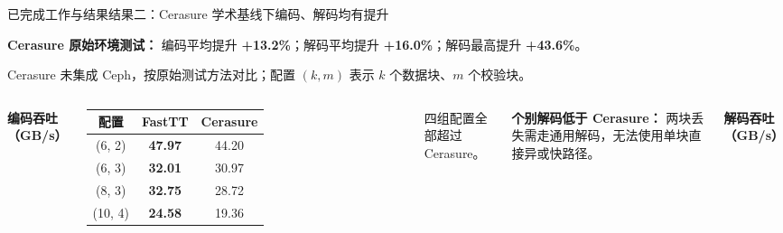 \begin{frame}[t]{已完成工作与结果}{结果二：Cerasure 学术基线下编码、解码均有提升}

    \vspace{-0.55em}
    {\scriptsize\textbf{Cerasure 原始环境测试：}
    编码平均提升 \textbf{+13.2\%}；解码平均提升 \textbf{+16.0\%}；解码最高提升 \textbf{+43.6\%}。}

    \vspace{0.15em}
    {\tiny Cerasure 未集成 Ceph，按原始测试方法对比；配置 $(k,m)$ 表示 $k$ 个数据块、$m$ 个校验块。}

    \vspace{0.15em}
    \begin{columns}[T,onlytextwidth]
        \centering
        \scriptsize\textbf{编码吞吐（GB/s）}

        \vspace{0.15em}
        \scriptsize
        \setlength{\tabcolsep}{4pt}
        \renewcommand{\arraystretch}{1.05}
        \begin{tabular}{ccc}
            \toprule
            配置 & FastTT & Cerasure \\
            \midrule
            (6, 2)  & \textbf{47.97} & 44.20 \\
            (6, 3)  & \textbf{32.01} & 30.97 \\
            (8, 3)  & \textbf{32.75} & 28.72 \\
            (10, 4) & \textbf{24.58} & 19.36 \\
            \bottomrule
        \end{tabular}

        \vspace{0.35em}
        {\tiny 四组配置全部超过 Cerasure。}

        \vspace{0.35em}
        \begin{minipage}{0.98\textwidth}
            \tiny\raggedright
            \textbf{个别解码低于 Cerasure：}
            两块丢失需走通用解码，无法使用单块直接异或快路径。
        \end{minipage}

        \centering
        \scriptsize\textbf{解码吞吐（GB/s）}


\end{columns}
\end{frame}
